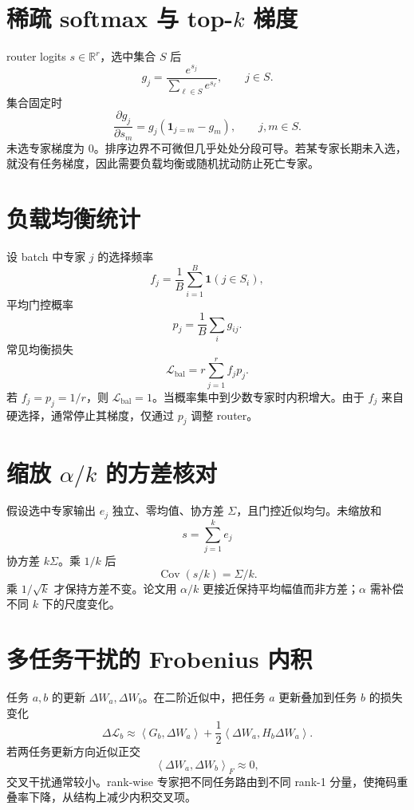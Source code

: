 \documentclass[UTF8,12pt,a4paper,fontset=none]{ctexart}
\numberwithin{equation}{section}
\newcommand{\R}{\mathbb{R}}
\newcommand{\Loss}{\mathcal{L}}
\newcommand{\ip}[2]{\left\langle #1,#2\right\rangle}
\begin{document}
\section{稀疏 softmax 与 top-$k$ 梯度}
router logits $s\in\R^r$，选中集合 $S$ 后
\begin{equation}
 g_j=\frac{e^{s_j}}{\sum_{\ell\in S}e^{s_\ell}},
 \qquad j\in S.
\end{equation}
集合固定时
\begin{equation}
 \frac{\partial g_j}{\partial s_m}
 =g_j(\mathbf1_{j=m}-g_m),
 \qquad j,m\in S.
\end{equation}
未选专家梯度为 0。排序边界不可微但几乎处处分段可导。若某专家长期未入选，就没有任务梯度，因此需要负载均衡或随机扰动防止死亡专家。

\section{负载均衡统计}
设 batch 中专家 $j$ 的选择频率
\begin{equation}
 f_j=\frac1B\sum_{i=1}^{B}\mathbf1(j\in S_i),
\end{equation}
平均门控概率
\begin{equation}
 p_j=\frac1B\sum_i g_{ij}.
\end{equation}
常见均衡损失
\begin{equation}
 \Loss_{\mathrm{bal}}=r\sum_{j=1}^{r}f_jp_j.
\end{equation}
若 $f_j=p_j=1/r$，则 $\Loss_{\mathrm{bal}}=1$。当概率集中到少数专家时内积增大。由于 $f_j$ 来自硬选择，通常停止其梯度，仅通过 $p_j$ 调整 router。

\section{缩放 $\alpha/k$ 的方差核对}
假设选中专家输出 $e_j$ 独立、零均值、协方差 $\Sigma$，且门控近似均匀。未缩放和
\begin{equation}
 s=\sum_{j=1}^{k}e_j
\end{equation}
协方差 $k\Sigma$。乘 $1/k$ 后
\begin{equation}
 \operatorname{Cov}(s/k)=\Sigma/k.
\end{equation}
乘 $1/\sqrt{k}$ 才保持方差不变。论文用 $\alpha/k$ 更接近保持平均幅值而非方差；$\alpha$ 需补偿不同 $k$ 下的尺度变化。

\section{多任务干扰的 Frobenius 内积}
任务 $a,b$ 的更新 $\Delta W_a,\Delta W_b$。在二阶近似中，把任务 $a$ 更新叠加到任务 $b$ 的损失变化
\begin{equation}
 \Delta\Loss_b
 \approx\ip{G_b}{\Delta W_a}
 +\frac12\ip{\Delta W_a}{H_b\Delta W_a}.
\end{equation}
若两任务更新方向近似正交
\begin{equation}
 \ip{\Delta W_a}{\Delta W_b}_F\approx0,
\end{equation}
交叉干扰通常较小。rank-wise 专家把不同任务路由到不同 rank-1 分量，使掩码重叠率下降，从结构上减少内积交叉项。
\end{document}
